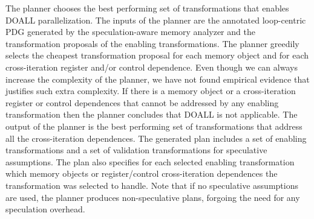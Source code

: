 The planner chooses the best performing set of transformations that
enables DOALL parallelization.
%
The inputs of the planner are the annotated loop-centric PDG generated
by the speculation-aware memory analyzer and the transformation
proposals of the enabling transformations.
%
%
%
The planner greedily selects the cheapest transformation proposal for
each memory object and for each cross-iteration register and/or control
dependence.
%
%
Even though we can always increase the complexity of the planner, we
have not found empirical evidence that justifies such extra
complexity.
%
If there is a memory object or a cross-iteration register or control
dependences that cannot be addressed by any enabling transformation
then the planner concludes that DOALL is not applicable.
%
%
The output of the planner is the best performing
set of transformations that address all the cross-iteration
dependences.
%
%
The generated plan includes a set of enabling transformations and a
set of validation transformations for speculative assumptions. The
plan also specifies for each selected enabling transformation which
memory objects or register/control cross-iteration dependences the
transformation was selected to handle.
%
Note that if no speculative assumptions are used, the planner produces
non-speculative plans, forgoing the need for any speculation overhead.
